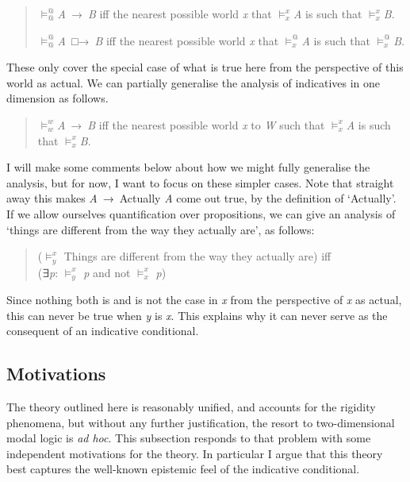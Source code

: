\documentclass[
  10pt,
  letterpaper,
  DIV=11,
  numbers=noendperiod,
  twoside]{scrartcl}
\begin{document}
\begin{quote}
\(\vDash_@^@\)\emph{A}~→~\emph{B} iff the nearest possible world
\emph{x} that \(\vDash_x^x\)\emph{A} is such that
\(\vDash_x^x\)\emph{B}.

\(\vDash_@^@\)\emph{A}~□→~\emph{B} iff the nearest possible world
\emph{x} that \(\vDash_x^@\)\emph{A} is such that
\(\vDash_x^@\)\emph{B}.
\end{quote}

These only cover the special case of what is true here from the
perspective of this world as actual. We can partially generalise the
analysis of indicatives in one dimension as follows.

\begin{quote}
\(\vDash_w^w\)\emph{A}~→~\emph{B} iff the nearest possible world
\emph{x} to \emph{W} such that \(\vDash_x^x\)\emph{A} is such that
\(\vDash_x^x\)\emph{B}.
\end{quote}

I will make some comments below about how we might fully generalise the
analysis, but for now, I want to focus on these simpler cases. Note that
straight away this makes \emph{A}~→~Actually \emph{A} come out true, by
the definition of `Actually'. If we allow ourselves quantification over
propositions, we can give an analysis of `things are different from the
way they actually are', as follows:

\begin{quote}
(\(\vDash_y^x\) Things are different from the way they actually are)
iff\\
(∃\emph{p}: \(\vDash_y^x\) \emph{p} and not \(\vDash_x^x\) \emph{p})
\end{quote}

Since nothing both is and is not the case in \emph{x} from the
perspective of \emph{x} as actual, this can never be true when \emph{y}
is \emph{x}. This explains why it can never serve as the consequent of
an indicative conditional.

\subsection{Motivations}\label{motivations}

The theory outlined here is reasonably unified, and accounts for the
rigidity phenomena, but without any further justification, the resort to
two-dimensional modal logic is \emph{ad hoc}. This subsection responds
to that problem with some independent motivations for the theory. In
particular I argue that this theory best captures the well-known
epistemic feel of the indicative conditional.
\end{document}
